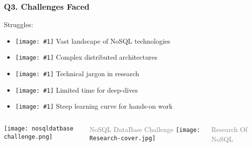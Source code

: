 \documentclass{beamer}
\newcommand{\icon}[1]{\texttt{[image: \#1]}}
\begin{document}
\begin{frame}
\frametitle{Q3. Challenges Faced}
\vspace{-0.4cm}
\begin{block}{Struggles:}
    \begin{itemize}
        \item \icon{challenges.png} Vast landscape of NoSQL technologies
        \item \icon{challenges.png} Complex distributed architectures
        \item \icon{challenges.png} Technical jargon in research
        \item \icon{challenges.png} Limited time for deep-dives
        \item \icon{challenges.png} Steep learning curve for hands-on work
    \end{itemize}
\end{block}
\vspace{0.1cm}
\begin{columns}
    \texttt{[image: nosqldatbase challenge.png]}
    \par\scriptsize\textcolor{gray}{NoSQL DataBase Challenge}
    \texttt{[image: Research-cover.jpg]}
    \par\scriptsize\textcolor{gray}{Research Of NoSQL}
\end{columns}
\end{frame}

\end{document}
